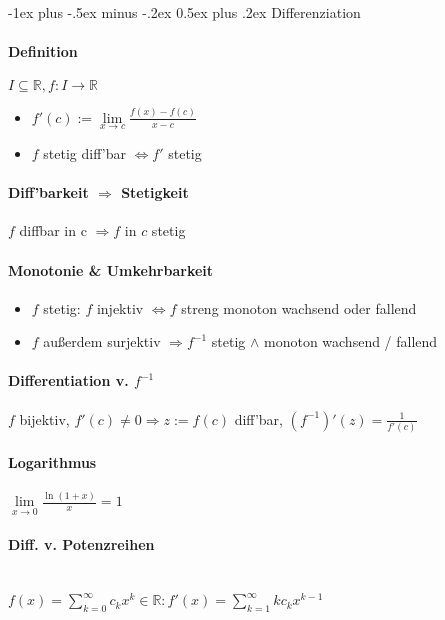 \documentclass[paper=a3,paper=landscape, fontsize=9pt,DIV=25]{scrartcl}
\makeatletter
\newcommand{\real}{{\mathbb{R}}}
\renewcommand{\section}{\@startsection{section}{1}{0mm}%
  {-1ex plus -.5ex minus -.2ex}%
  {0.5ex plus .2ex}%
  {\color{blue}\normalfont\large\bfseries}}
\makeatother
\begin{document}
\begin{multicols*}{4}
  \section{Differenziation}

  \paragraph{Definition}
  $I \subseteq \real, f: I \rightarrow \real$
  \begin{itemize}
  \item $f'(c) := \lim\limits_{x \rightarrow c} \frac{f(x)-f(c)}{x-c}$
  \item $f$ stetig diff'bar $\Leftrightarrow f'$ stetig
  \end{itemize}


  \paragraph{Diff'barkeit $\Rightarrow$ Stetigkeit}
  $f$ diffbar in c $\Rightarrow f$ in $c$ stetig


  \paragraph{Monotonie \& Umkehrbarkeit}
  \begin{itemize}
  \item $f$ stetig: $f$ injektiv $\Leftrightarrow f$ streng monoton wachsend oder fallend
  \item $f$ außerdem surjektiv $\Rightarrow f^{-1}$ stetig $\wedge$ monoton wachsend / fallend
  \end{itemize}


  \paragraph{Differentiation v. $f^{-1}$}
  $f$ bijektiv, $f'(c) \neq 0 \Rightarrow z := f(c)$ diff'bar, $(f^{-1})'(z)=\frac{1}{f'(c)}$


  \paragraph{Logarithmus}
  $\lim\limits_{x\rightarrow0} \frac{\ln(1+x)}{x}=1$


  \paragraph{Diff. v. Potenzreihen}\hspace{0pt}\\
  $ f(x)=\sum_{k=0}^{\infty}c_kx^k \in \real: f'(x)=\sum_{k=1}^{\infty}kc_kx^{k-1}$



\end{multicols*}
\end{document}
